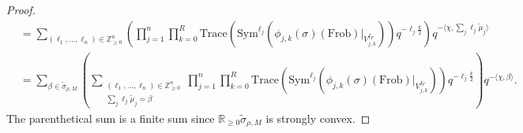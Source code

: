 \documentclass[10pt]{amsart}
\theoremstyle{definition}
\numberwithin{equation}{section}
\numberwithin{equation}{subsection}
\newcommand{\RR}{\mathbb{R}}
\begin{document}
\begin{proof}
\begin{align}
    \nonumber &=\sum_{(\ell_1,\ldots,\ell_n)\in\mathbb{Z}_{\geq 0}^n}\left(\prod_{j=1}^n\prod_{k=0}^R \mathrm{Trace}\left(\mathrm{Sym}^{\ell_j}\left(\phi_{j,k}(\sigma)(\mathrm{Frob})\big|_{V_{j,k}^{I_F}}\right)\right)q^{-\ell_j\frac{k}{2}}\right)q^{- \langle\chi,\sum_j\ell_j\widetilde{\mu}_j\rangle}\\
    &=\sum_{\beta\in \widetilde{\sigma}_{\rho,M}} \left(\sum_{\substack{(\ell_1,\ldots,\ell_n)\in\mathbb{Z}_{\geq 0}^n\\
    \sum_j\ell_j\widetilde{\mu}_j = \beta}} \prod_{j=1}^n\prod_{k=0}^R  \mathrm{Trace}\left(\mathrm{Sym}^{\ell_j}\left(\phi_{j,k}(\sigma)(\mathrm{Frob})\big|_{V_{j,k}^{I_F}}\right)\right)q^{-\ell_j\frac{k}{2}}\right) q^{-\langle\chi,\beta\rangle}.
\end{align}
The parenthetical sum is a finite sum since $\RR_{\ge 0}\widetilde{\sigma}_{\rho,M}$ is strongly convex. 


\end{proof}
\end{document}
